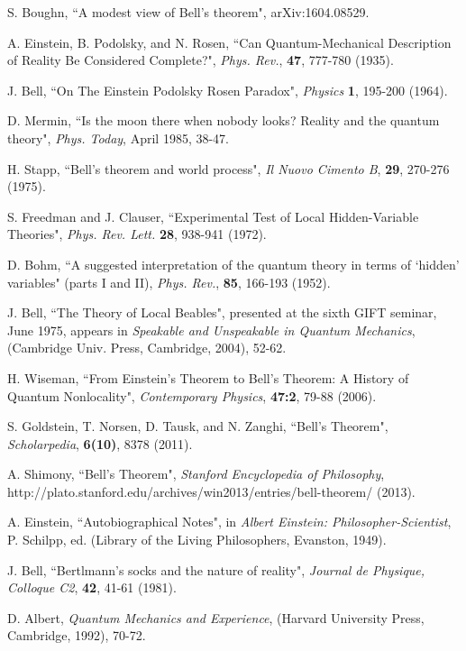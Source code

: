 \documentclass[12pt]{article}
\begin{document}
\begin{thebibliography}{99}

 S. Boughn, ``A modest view of Bell's theorem", arXiv:1604.08529.

 A. Einstein, B. Podolsky, and N. Rosen, ``Can Quantum-Mechanical Description of Reality Be Considered Complete?", {\it Phys. Rev.}, \textbf{47}, 777-780 (1935).

 J. Bell, ``On The Einstein Podolsky Rosen Paradox", {\it Physics} \textbf{1}, 195-200 (1964).

 D. Mermin, ``Is the moon there when nobody looks? Reality and the quantum theory", {\it Phys. Today}, April 1985, 38-47.

 H. Stapp, ``Bell's theorem and world process", {\it Il Nuovo Cimento B}, \textbf{29}, 270-276 (1975).

 S. Freedman and J. Clauser, ``Experimental Test of Local Hidden-Variable Theories", {\it Phys. Rev. Lett.} \textbf{28}, 938-941 (1972).

 D. Bohm, ``A suggested interpretation of the quantum theory in terms of `hidden' variables" (parts I and II), {\it Phys. Rev.}, \textbf{85}, 166-193 (1952).

 J. Bell, ``The Theory of Local Beables", presented at the sixth GIFT seminar, June 1975, appears in {\it Speakable and Unspeakable in Quantum Mechanics}, (Cambridge Univ. Press, Cambridge, 2004), 52-62.

 H. Wiseman, ``From Einstein's Theorem to Bell's Theorem: A History of Quantum Nonlocality", {\it Contemporary Physics}, \textbf{47:2}, 79-88 (2006).

 S. Goldstein, T. Norsen, D. Tausk, and N. Zanghi, ``Bell's Theorem", {\it Scholarpedia}, \textbf{6(10)}, 8378 (2011).

 A. Shimony, ``Bell's Theorem", {\it Stanford Encyclopedia of Philosophy}, http://plato.stanford.edu/archives/win2013/entries/bell-theorem/ (2013).

 A. Einstein, ``Autobiographical Notes", in {\it Albert Einstein: Philosopher-Scientist}, P. Schilpp, ed. (Library of the Living Philosophers, Evanston, 1949).

 J. Bell, ``Bertlmann's socks and the nature of reality", {\it Journal de Physique, Colloque C2}, \textbf{42}, 41-61 (1981).

 D. Albert, {\it Quantum Mechanics and Experience}, (Harvard University Press, Cambridge, 1992), 70-72.


\end{thebibliography}
\end{document}
